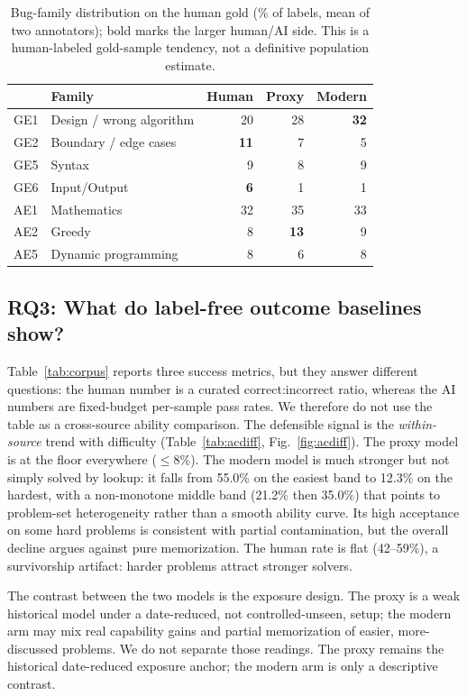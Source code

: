 \documentclass[conference]{IEEEtran}
\begin{document}
\begin{table}[t]
\centering
\caption{Bug-family distribution on the human gold (\% of labels, mean of two
annotators); bold marks the larger human/AI side. This is a human-labeled
gold-sample tendency, not a definitive population estimate.}
\label{tab:family}
\begin{tabular}{llrrr}
\toprule
& Family & Human & Proxy & Modern\\
\midrule
GE1 & Design / wrong algorithm & 20 & 28 & \textbf{32}\\
GE2 & Boundary / edge cases & \textbf{11} & 7 & 5\\
GE5 & Syntax & 9 & 8 & 9\\
GE6 & Input/Output & \textbf{6} & 1 & 1\\
AE1 & Mathematics & 32 & 35 & 33\\
AE2 & Greedy & 8 & \textbf{13} & 9\\
AE5 & Dynamic programming & 8 & 6 & 8\\
\bottomrule
\end{tabular}
\end{table}

\subsection{RQ3: What do label-free outcome baselines show?}
\label{sec:rq3}
Table~\ref{tab:corpus} reports three success metrics, but they answer different
questions: the human number is a curated correct:incorrect ratio, whereas the AI
numbers are fixed-budget per-sample pass rates. We therefore do not use the table as
a cross-source ability comparison. The defensible signal is the \emph{within-source}
trend with difficulty (Table~\ref{tab:acdiff}, Fig.~\ref{fig:acdiff}). The proxy
model is at the floor everywhere ($\le8\%$). The modern model is much stronger but
not simply solved by lookup: it falls from 55.0\% on the easiest band to 12.3\% on
the hardest, with a non-monotone middle band (21.2\% then 35.0\%) that points to
problem-set heterogeneity rather than a smooth ability curve. Its high acceptance on
some hard problems is consistent with partial contamination, but the overall decline
argues against pure memorization. The human rate is flat (42--59\%), a survivorship
artifact: harder problems attract stronger solvers.

The contrast between the two models is the exposure design. The proxy is a weak
historical model under a date-reduced, not controlled-unseen, setup; the modern arm
may mix real capability gains and partial memorization of easier, more-discussed
problems. We do not separate those readings. The proxy remains the historical
date-reduced exposure anchor; the modern arm is only a descriptive contrast.
\end{document}
